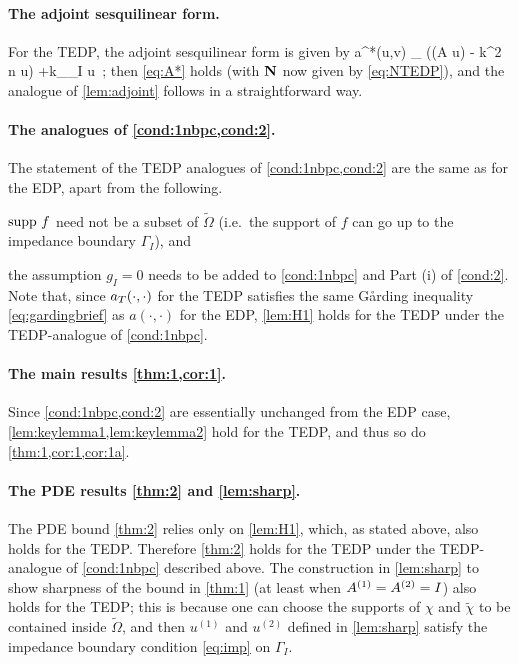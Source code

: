 \paragraph{The adjoint sesquilinear form.} For the TEDP, the adjoint sesquilinear form is given by 
\beq\label{eq:TEDPadjoint}
a^*(u,v) \de \int_{\DR} 
\Big((A \grad u)\cdot\grad \vb
 - k^2 n u\vb\Big) +\ri k\int_{\Gamma_I} \gamma u\, ;
\eeq
then \cref{eq:A*} holds (with $\mathbf{N}$ now given by \cref{eq:NTEDP}), and the analogue of \cref{lem:adjoint} follows in a straightforward way.


\paragraph{The analogues of \cref{cond:1nbpc,cond:2}.}
The statement of the TEDP analogues of \cref{cond:1nbpc,cond:2} are the same as for the EDP, apart from the following.
\ben
\item
$\operatorname{supp} \,f$ need not be a subset of $\widetilde{\Omega}$ (i.e.~the support of $f$ can go up to the impedance boundary $\Gamma_I$), and
\item the assumption $g_I= 0$ needs to be added to \cref{cond:1nbpc} and Part (i) of \cref{cond:2}.
\een
 Note that, since $a_{T}(\cdot,\cdot)$ for the TEDP satisfies the same G\aa rding inequality \cref{eq:gardingbrief} as $a(\cdot,\cdot)$ for the EDP, \cref{lem:H1} holds for the TEDP under the TEDP-analogue of \cref{cond:1nbpc}.

\paragraph{The main results \cref{thm:1,cor:1}.}
Since \cref{cond:1nbpc,cond:2} are essentially unchanged from the EDP case, \cref{lem:keylemma1,lem:keylemma2} hold for the TEDP, and thus so do \cref{thm:1,cor:1,cor:1a}.

\paragraph{The PDE results \cref{thm:2} and \cref{lem:sharp}.}

The PDE bound \cref{thm:2} relies only on \cref{lem:H1}, which, as stated above, also holds for the TEDP. Therefore \cref{thm:2} holds for the TEDP under the TEDP-analogue of \cref{cond:1nbpc} described above. The construction in \cref{lem:sharp} to show sharpness of the bound in \cref{thm:1} (at least when ${A}^{(1)}= {A}^{(2)}= I$) also holds for the TEDP; this is because one can choose the supports of $\chi$ and $\widetilde{\chi}$ to be contained inside $\widetilde{\Omega}$, and then $u^{(1)}$ and $u^{(2)}$ defined in \cref{lem:sharp} satisfy the impedance boundary condition \cref{eq:imp} on $\Gamma_I$.

